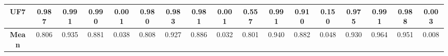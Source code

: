 \begin{table*}[]
{\begin{tabular}{c c|c|c|c|c|c|c|c|c|c|c|c|c|c|c|c}
\multicolumn{1}{c|}{\textbf{UF7}} & 0.987 & 0.991 & 0.990 & 0.001 & 0.980 & 0.983 & 0.981 & 0.001 & 0.557 & 0.991 & 0.910 & 0.150 & 0.975 & 0.991 & 0.988 & 0.003 \\ \hline
\multicolumn{1}{c|}{\textbf{Mean}} & 0.806 & 0.935 & 0.881 & 0.038 & 0.808 & 0.927 & 0.886 & 0.032 & 0.801 & 0.940 & 0.882 & 0.048 & 0.930 & 0.964 & 0.951 & 0.008 \\ \hline
\end{tabular}%
}
\end{table*}




